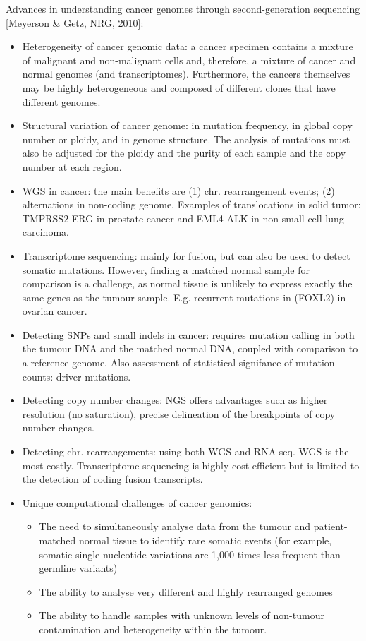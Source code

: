 \documentclass{report}
\begin{document}
Advances in understanding cancer genomes through second-generation sequencing [Meyerson \& Getz, NRG, 2010]: 
\begin{itemize}
	\item Heterogeneity of cancer genomic data: a cancer specimen contains a mixture of malignant and non-malignant cells and, therefore, a mixture of cancer and normal genomes (and transcriptomes). Furthermore, the cancers themselves may be highly heterogeneous and composed of different clones that have different genomes. 
	
	\item Structural variation of cancer genome: in mutation frequency, in global copy number or ploidy, and in genome structure. The analysis of mutations must also be adjusted for the ploidy and the purity of each sample and the copy number at each region.
	
	\item WGS in cancer: the main benefits are (1) chr. rearrangement events; (2) alternations in non-coding genome. Examples of translocations in solid tumor: TMPRSS2-ERG in prostate cancer and EML4-ALK in non-small cell lung carcinoma. 
	
	\item Transcriptome sequencing: mainly for fusion, but can also be used to detect somatic mutations. However, finding a matched normal sample for comparison is a challenge, as normal tissue is unlikely to express exactly the same genes as the tumour sample. E.g. recurrent mutations in (FOXL2) in ovarian cancer. 
	
	\item Detecting SNPs and small indels in cancer: requires mutation calling in both the tumour DNA and the matched normal DNA, coupled with comparison to a reference genome. Also assessment of statistical signifance of mutation counts: driver mutations. 
	
	\item Detecting copy number changes: NGS offers advantages such as higher resolution (no saturation), precise delineation of the breakpoints of copy number changes. 
	
	\item Detecting chr. rearrangements: using both WGS and RNA-seq. WGS is the most costly. Transcriptome sequencing is highly cost efficient but is limited to the detection of coding fusion transcripts. 
	
	\item Unique computational challenges of cancer genomics: 
	\begin{itemize}
		\item The need to simultaneously analyse data from the tumour and patient-matched normal tissue to identify rare somatic events (for example, somatic single nucleotide variations are 1,000 times less frequent than germline variants)
		\item The ability to analyse very different and highly rearranged genomes
		\item The ability to handle samples with unknown levels of non-tumour contamination and heterogeneity within the tumour.
	\end{itemize}
	

\end{itemize}
\end{document}
